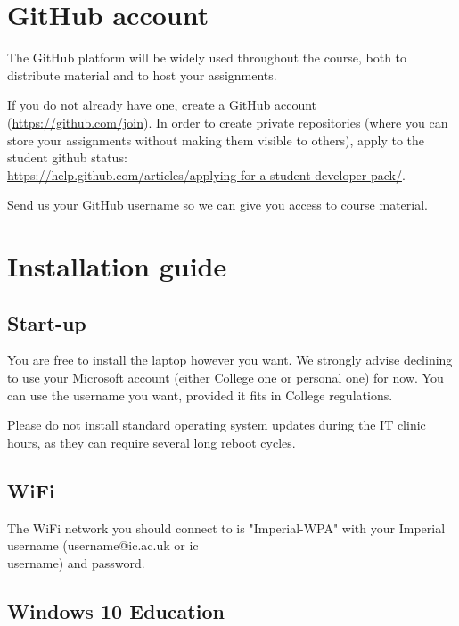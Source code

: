 \documentclass[11pt]{article}
\begin{document}
\section{GitHub account}

The GitHub platform will be widely used throughout the course, both to distribute material and to host your assignments.

If you do not already have one, create a GitHub account (\url{https://github.com/join}).
In order to create private repositories (where you can store your assignments without making them visible to others), apply to the student github status:\\ 
\url{https://help.github.com/articles/applying-for-a-student-developer-pack/}.

Send us your GitHub username so we can give you access to course material.


\section{Installation guide}

\subsection{Start-up}

You are free to install the laptop however you want. We strongly advise declining to use your Microsoft account (either College one or personal one) for now. You can use the username you want, provided it fits in College regulations. 

Please do not install standard operating system updates during the IT clinic hours, as they can require several long reboot cycles.

\subsection{WiFi}
The WiFi network you should connect to is "Imperial-WPA" with your Imperial username (username@ic.ac.uk or ic\\username) and password.

\subsection{Windows 10 Education}
\end{document}
